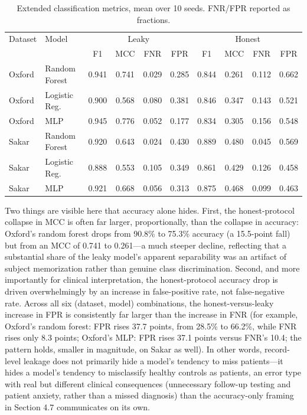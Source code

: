 \documentclass[11pt]{article}
\begin{document}
\begin{table}[h]
\centering
\caption{Extended classification metrics, mean over 10 seeds. FNR/FPR reported as fractions.}
\begin{tabular}{llcccccccc}
\toprule
Dataset & Model & \multicolumn{4}{c}{Leaky} & \multicolumn{4}{c}{Honest} \\
 & & F1 & MCC & FNR & FPR & F1 & MCC & FNR & FPR \\
\midrule
Oxford & Random Forest & 0.941 & 0.741 & 0.029 & 0.285 & 0.844 & 0.261 & 0.112 & 0.662 \\
Oxford & Logistic Reg.\ & 0.900 & 0.568 & 0.080 & 0.381 & 0.846 & 0.347 & 0.143 & 0.521 \\
Oxford & MLP & 0.945 & 0.776 & 0.052 & 0.177 & 0.834 & 0.305 & 0.156 & 0.548 \\
Sakar & Random Forest & 0.920 & 0.643 & 0.024 & 0.430 & 0.889 & 0.480 & 0.045 & 0.569 \\
Sakar & Logistic Reg.\ & 0.888 & 0.553 & 0.105 & 0.349 & 0.861 & 0.429 & 0.126 & 0.458 \\
Sakar & MLP & 0.921 & 0.668 & 0.056 & 0.313 & 0.875 & 0.468 & 0.099 & 0.463 \\
\bottomrule
\end{tabular}
\end{table}

Two things are visible here that accuracy alone hides. First, the honest-protocol collapse in MCC is often far larger, proportionally, than the collapse in accuracy: Oxford's random forest drops from 90.8\% to 75.3\% accuracy (a 15.5-point fall) but from an MCC of 0.741 to 0.261---a much steeper decline, reflecting that a substantial share of the leaky model's apparent separability was an artifact of subject memorization rather than genuine class discrimination. Second, and more importantly for clinical interpretation, the honest-protocol accuracy drop is driven overwhelmingly by an increase in false-positive rate, not false-negative rate. Across all six (dataset, model) combinations, the honest-versus-leaky increase in FPR is consistently far larger than the increase in FNR (for example, Oxford's random forest: FPR rises 37.7 points, from 28.5\% to 66.2\%, while FNR rises only 8.3 points; Oxford's MLP: FPR rises 37.1 points versus FNR's 10.4; the pattern holds, smaller in magnitude, on Sakar as well). In other words, record-level leakage does not primarily hide a model's tendency to miss patients---it hides a model's tendency to misclassify healthy controls as patients, an error type with real but different clinical consequences (unnecessary follow-up testing and patient anxiety, rather than a missed diagnosis) than the accuracy-only framing in Section 4.7 communicates on its own.
\end{document}
